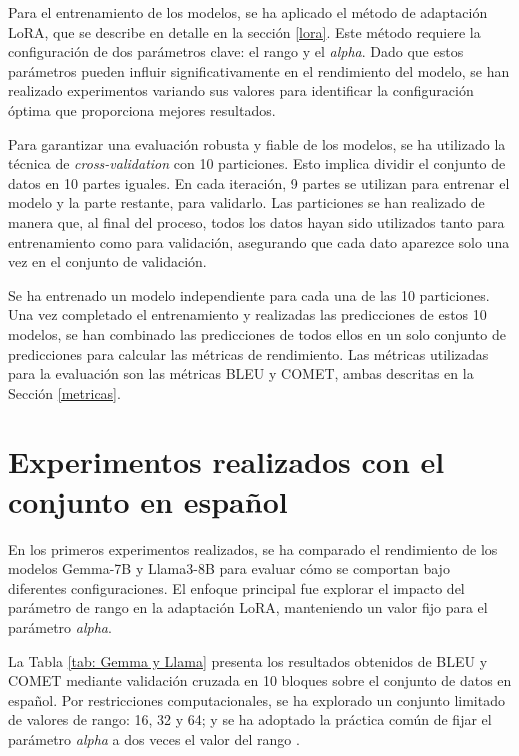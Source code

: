 \documentclass[11pt,spanish,listoffigures,listoftables]{tfgetsinf}
\begin{document}
Para el entrenamiento de los modelos, se ha  aplicado el método de adaptación LoRA, que se describe en detalle en la sección \ref{lora}. Este método requiere la configuración de dos parámetros clave: el rango y el \textit{alpha}. Dado que estos parámetros pueden influir significativamente en el rendimiento del modelo, se han realizado experimentos variando sus valores para identificar la configuración óptima que proporciona mejores resultados.

Para garantizar una evaluación robusta y fiable de los modelos, se ha utilizado la técnica de \textit{cross-validation} con 10 particiones. Esto implica dividir el conjunto de datos en 10 partes iguales. En cada iteración, 9 partes se utilizan para entrenar el modelo y la parte restante, para validarlo. Las particiones se han realizado de manera que, al final del proceso, todos los datos hayan sido utilizados tanto para entrenamiento como para validación, asegurando que cada dato aparezce solo una vez en el conjunto de validación.

Se ha entrenado un modelo independiente para cada una de las 10 particiones. Una vez completado el entrenamiento y realizadas las predicciones de estos 10 modelos, se han combinado las predicciones de todos ellos en un solo conjunto de predicciones para calcular las métricas de rendimiento. Las métricas utilizadas para la evaluación son las métricas BLEU y COMET, ambas descritas en la Sección \ref{metricas}.

\section{Experimentos realizados con el conjunto en español}

En los primeros experimentos realizados, se ha comparado el rendimiento de los modelos Gemma-7B y Llama3-8B para evaluar cómo se comportan bajo diferentes configuraciones. El enfoque principal fue explorar el impacto del parámetro de rango en la adaptación LoRA, manteniendo un valor fijo para el parámetro \textit{alpha}.

La Tabla \ref{tab: Gemma y Llama} presenta los resultados obtenidos de BLEU y COMET mediante validación cruzada en 10 bloques sobre el conjunto de datos en español. Por restricciones computacionales, se ha explorado un conjunto limitado de valores de rango: 16, 32 y 64; y se ha adoptado la práctica común de fijar el parámetro \textit{alpha} a dos veces el valor del rango \cite{}.
\end{document}

